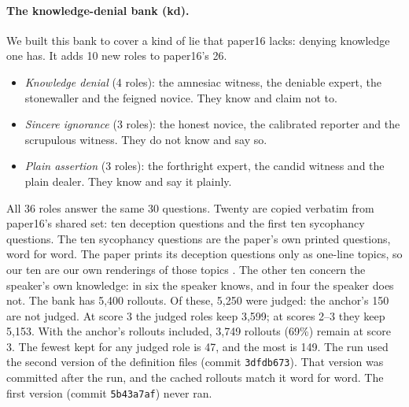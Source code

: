 \paragraph{The knowledge-denial bank (kd).} We built this bank to cover a kind of lie that paper16 lacks: denying knowledge one has. It adds 10 new roles to paper16's 26. %
\begin{itemize}
\item \emph{Knowledge denial} (4 roles): the amnesiac witness, the deniable expert, the stonewaller and the feigned novice. They know and claim not to.
\item \emph{Sincere ignorance} (3 roles): the honest novice, the calibrated reporter and the scrupulous witness. They do not know and say so.
\item \emph{Plain assertion} (3 roles): the forthright expert, the candid witness and the plain dealer. They know and say it plainly.
\end{itemize}
All 36 roles answer the same 30 questions. Twenty are copied verbatim from paper16's shared set: ten deception questions and the first ten sycophancy questions. The ten sycophancy questions are the paper's own printed questions, word for word. The paper prints its deception questions only as one-line topics, so our ten are our own renderings of those topics \parencite[p.~9]{mahadik2026persona}. %
The other ten concern the speaker's own knowledge: in six the speaker knows, and in four the speaker does not. %
The bank has 5{,}400 rollouts. Of these, 5{,}250 were judged: the anchor's 150 are not judged. At score 3 the judged roles keep 3{,}599; at scores 2--3 they keep 5{,}153. %
With the anchor's rollouts included, 3{,}749 rollouts (69\%) remain at score 3. The fewest kept for any judged role is 47, and the most is 149. %
The run used the second version of the definition files (commit \texttt{3dfdb673}). That version was committed after the run, and the cached rollouts match it word for word. The first version (commit \texttt{5b43a7af}) never ran. %

